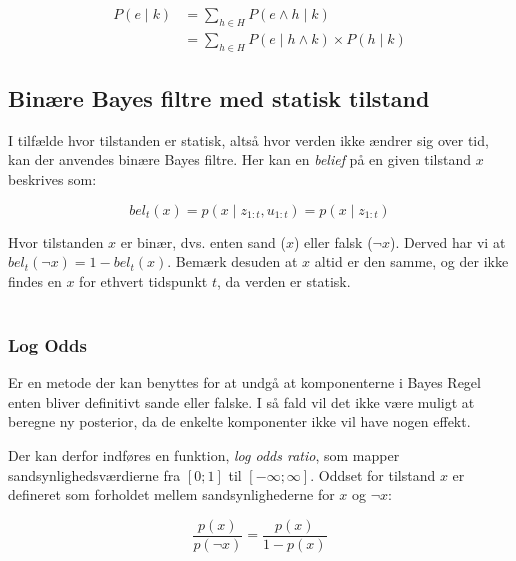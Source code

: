 \begin{equation}
\begin{split}
	P(e \mid k) &= \sum_{h \in H} P(e \wedge h \mid k) \\
	&= \sum_{h \in H}P(e \mid h \wedge k) \times P(h \mid k)
\end{split}
\end{equation}

\cite[s. 229]{ArtificialIntelligence}

\subsection{Binære Bayes filtre med statisk tilstand}\label{bayes_binaerfiltre}
I tilfælde hvor tilstanden er statisk, altså hvor verden ikke ændrer sig over tid, kan der anvendes binære Bayes filtre.
Her kan en \textit{belief} på en given tilstand $x$ beskrives som:

\begin{equation}
bel_t(x) = p(x \mid z_{1:t},u_{1:t}) = p(x \mid z_{1:t})
\end{equation}

Hvor tilstanden $x$ er binær, dvs. enten sand ($x$) eller falsk ($\lnot x$).
Derved har vi at $bel_t(\lnot x) = 1 - bel_t(x)$.
Bemærk desuden at $x$ altid er den samme, og der ikke findes en $x$ for ethvert tidspunkt $t$, da verden er statisk. \\ \\
\cite[s. 94]{probabilisticRobotics}

\subsubsection{Log Odds}
Er en metode der kan benyttes for at undgå at komponenterne i Bayes Regel enten bliver definitivt sande eller falske.
I så fald vil det ikke være muligt at beregne ny posterior, da de enkelte komponenter ikke vil have nogen effekt.

Der kan derfor indføres en funktion, \textit{log odds ratio}, som mapper sandsynlighedsværdierne fra $[0;1]$ til $[-\infty;\infty]$.
Oddset for tilstand $x$ er defineret som forholdet mellem sandsynlighederne for $x$ og $\lnot x$: 

\begin{equation}
\frac{p(x)}{p(\lnot x)} = \frac{p(x)}{1 - p(x)}
\end{equation} 

\cite[s. 94]{probabilisticRobotics} \\

